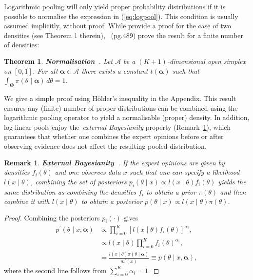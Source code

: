 \documentclass[12pt]{article}
\newtheorem{theo}{Theorem}[]
\newtheorem{remark}{Remark}[]
\begin{document}
Logarithmic pooling will only yield proper probability distributions if it is possible to normalise the expression in (\ref{eq:logpool}).
This condition is usually assumed implicitly, without proof.
While \textcite{Poole2000} provide a proof for the case of two densities (see Theorem 1 therein),~\textcite{Genest1986A} (pg.489) prove the result for a finite number of densities:
\begin{theo}
\label{thm:normalisation}
\textbf{Normalisation~\parencite{Genest1986A}}. 
Let $\mathcal{A}$ be a $(K+1)$-dimensional open simplex on $[0,1]$.
For all $\boldsymbol\alpha \in \mathcal{A}$ there exists a constant $t(\boldsymbol\alpha)$ such that $\int_{\boldsymbol\Theta}\pi(\theta \mid \boldsymbol \alpha)\, d\theta = 1$.
\end{theo}
We give a simple proof using H\"{o}lder's inequality in the Appendix.
This result ensures any (finite) number of proper distributions can be combined using the logarithmic pooling operator to yield a normalisable (proper) density.
In addition, log-linear pools enjoy the~\textit{external Bayesianity} property (Remark~\ref{rmk:properties_EB}), which guarantees that whether one combines the expert opinions before or after observing evidence does not affect the resulting pooled distribution.
\begin{remark}
\label{rmk:properties_EB}
 \textbf{External Bayesianity~\parencite{Genest1984}}.
 If the expert opinions are given by densities $f_i(\theta)$ and one observes data $x$ such that one can specify a likelihood $l(x \mid \theta)$, combining the set of posteriors $p_i(\theta \mid x) \propto  l(x \mid \theta)f_i(\theta) $ yields the same distribution as combining the densities $f_i$ to obtain a prior $\pi(\theta)$ and then combine it with $l(x \mid \theta)$ to obtain a posterior $p(\theta \mid x) \propto l(x \mid \theta)\pi(\theta)$.
\end{remark}
\begin{proof}
 Combining the posteriors $p_i(\cdot)$ gives
 \begin{align*}
  p^\prime (\theta \mid x, \boldsymbol \alpha) &\propto \prod_{i = 0}^K \left[  l(x \mid \theta)f_i(\theta) \right]^{\alpha_i},\\
  &\propto   l(x \mid \theta) \prod_{i = 0}^K f_i(\theta)^{\alpha_i},\\
  &=  \frac{l(x \mid \theta)\pi(\theta \mid \boldsymbol \alpha)}{m^{\prime}(x)} \equiv   p(\theta \mid x, \boldsymbol \alpha),
 \end{align*}
 where the second line follows from $\sum_{i=0}^K \alpha_i = 1$.
\end{proof}
\end{document}
